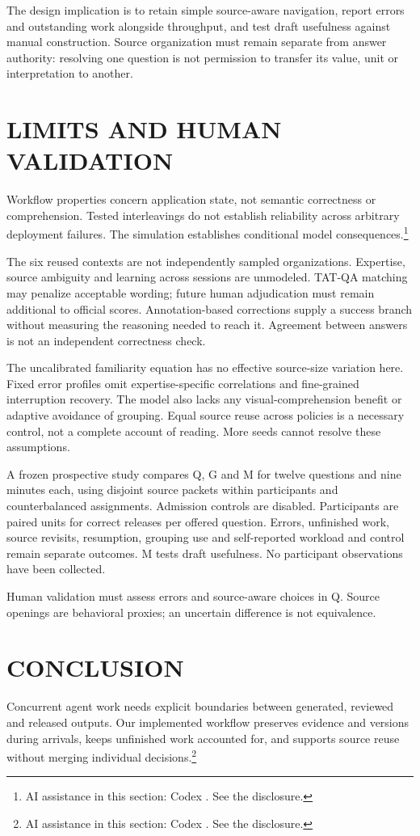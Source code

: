 \documentclass[a4paper,twoside]{article}
\newcommand{\aicredit}{\footnote{AI assistance in this section: Codex \cite{codex}. See the disclosure.}}
\begin{document}
The design implication is to retain simple source-aware navigation, report errors and outstanding work alongside throughput, and test draft usefulness against manual construction. Source organization must remain separate from answer authority: resolving one question is not permission to transfer its value, unit or interpretation to another.

\section{LIMITS AND HUMAN VALIDATION}
\label{sec:limits}
Workflow properties concern application state, not semantic correctness or comprehension. Tested interleavings do not establish reliability across arbitrary deployment failures. The simulation establishes conditional model consequences.\aicredit

The six reused contexts are not independently sampled organizations. Expertise, source ambiguity and learning across sessions are unmodeled. TAT-QA matching may penalize acceptable wording; future human adjudication must remain additional to official scores. Annotation-based corrections supply a success branch without measuring the reasoning needed to reach it. Agreement between answers is not an independent correctness check.

The uncalibrated familiarity equation has no effective source-size variation here. Fixed error profiles omit expertise-specific correlations and fine-grained interruption recovery. The model also lacks any visual-comprehension benefit or adaptive avoidance of grouping. Equal source reuse across policies is a necessary control, not a complete account of reading. More seeds cannot resolve these assumptions.

A frozen prospective study compares Q, G and M for twelve questions and nine minutes each, using disjoint source packets within participants and counterbalanced assignments. Admission controls are disabled. Participants are paired units for correct releases per offered question. Errors, unfinished work, source revisits, resumption, grouping use and self-reported workload and control remain separate outcomes. M tests draft usefulness. No participant observations have been collected.

Human validation must assess errors and source-aware choices in Q. Source openings are behavioral proxies; an uncertain difference is not equivalence.

\section{CONCLUSION}
Concurrent agent work needs explicit boundaries between generated, reviewed and released outputs. Our implemented workflow preserves evidence and versions during arrivals, keeps unfinished work accounted for, and supports source reuse without merging individual decisions.\aicredit
\end{document}
